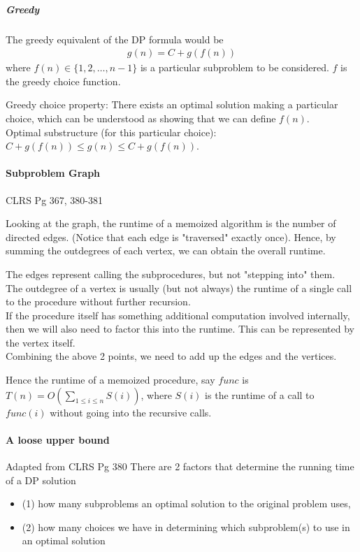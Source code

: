 \documentclass{article}
\begin{document}
\subparagraph{Greedy} The greedy equivalent of the DP formula would be
\begin{align*}
	g(n) = C + g(f(n))
\end{align*}
where $f(n)\in \{1,2,\dots, n-1\}$ is a particular subproblem to be considered. $f$ is the greedy choice function.

Greedy choice property: There exists an optimal solution making a particular choice, which can be understood as showing that we can define $f(n)$.\\
Optimal substructure (for this particular choice): $C + g(f(n))\leq g(n)\leq C + g(f(n))$.

\paragraph{Subproblem Graph} CLRS Pg 367, 380-381

Looking at the graph, the runtime of a memoized algorithm is the number of directed edges. (Notice that each edge is "traversed" exactly once). Hence, by summing the outdegrees of each vertex, we can obtain the overall runtime.


The edges represent calling the subprocedures, but not "stepping into" them.\\
The outdegree of a vertex is usually (but not always) the runtime of a single call to the procedure without further recursion. \\
If the procedure itself has something additional computation involved internally, then we will also need to factor this into the runtime. This can be represented by the vertex itself.\\
Combining the above 2 points, we need to add up the edges and the vertices.

Hence the runtime of a memoized procedure, say $func$ is $T(n) = O(\sum_{1\leq i\leq n}S(i))$, where $S(i)$ is the runtime of a call to $func(i)$ without going into the recursive calls.

\paragraph{A loose upper bound} Adapted from CLRS Pg 380
There are 2 factors that determine the running time of a DP solution
\begin{itemize}
	\item (1) how many subproblems an optimal solution to the original problem uses,
	\item (2) how many choices we have in determining which subproblem(s) to use in an
optimal solution
\end{itemize}
\end{document}
